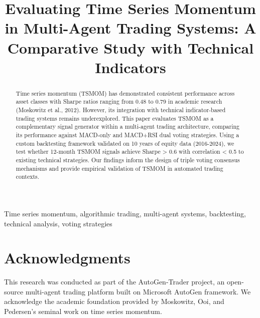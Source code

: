 \documentclass[conference]{IEEEtran}
\begin{document}
\title{Evaluating Time Series Momentum in Multi-Agent Trading Systems: A Comparative Study with Technical Indicators}

\author{
}

\maketitle

\begin{abstract}
Time series momentum (TSMOM) has demonstrated consistent performance across asset classes with Sharpe ratios ranging from 0.48 to 0.79 in academic research (Moskowitz et al., 2012). However, its integration with technical indicator-based trading systems remains underexplored. This paper evaluates TSMOM as a complementary signal generator within a multi-agent trading architecture, comparing its performance against MACD-only and MACD+RSI dual voting strategies. Using a custom backtesting framework validated on 10 years of equity data (2016-2024), we test whether 12-month TSMOM signals achieve Sharpe > 0.6 with correlation < 0.5 to existing technical strategies. Our findings inform the design of triple voting consensus mechanisms and provide empirical validation of TSMOM in automated trading contexts.
\end{abstract}

\begin{IEEEkeywords}
Time series momentum, algorithmic trading, multi-agent systems, backtesting, technical analysis, voting strategies
\end{IEEEkeywords}









\section*{Acknowledgments}
This research was conducted as part of the AutoGen-Trader project, an open-source multi-agent trading platform built on Microsoft AutoGen framework. We acknowledge the academic foundation provided by Moskowitz, Ooi, and Pedersen's seminal work on time series momentum.



\end{document}
